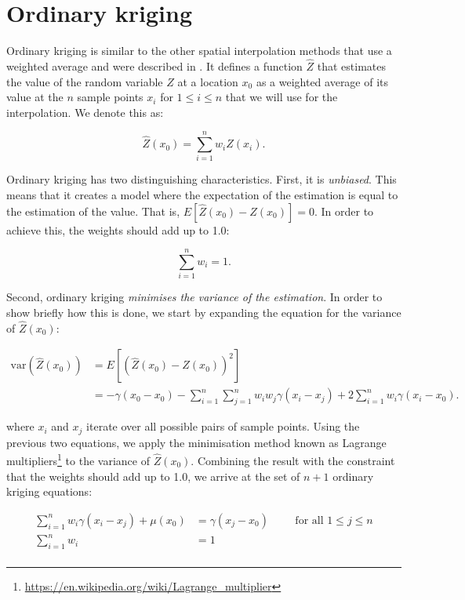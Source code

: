 \section{Ordinary kriging}

Ordinary kriging is similar to the other spatial interpolation methods that use a weighted average and were described in .
It defines a function \(\hat{Z}\) that estimates the value of the random variable \(Z\) at a location \(x_0\) as a weighted average of its value at the \(n\) sample points \(x_i\) for \(1 \leq i \leq n\) that we will use for the interpolation.
We denote this as:

\begin{equation}
\hat{Z}(x_0) = \sum_{i=1}^n w_i Z(x_i).
\end{equation}

Ordinary kriging has two distinguishing characteristics. First, it is \emph{unbiased}.
This means that it creates a model where the expectation of the estimation is equal to the estimation of the value.
That is, \(E\left[ \hat{Z}(x_0) - Z(x_0) \right] = 0\).
In order to achieve this, the weights should add up to 1.0:

\begin{equation}
\sum_{i=1}^n w_i = 1.
\end{equation}

Second, ordinary kriging \emph{minimises the variance of the estimation}. In order to show briefly how this is done, we start by expanding the equation for the variance of \(\hat{Z}\left(x_0\right)\):

\begin{align}
\mathrm{var}\left(\hat{Z}\left(x_0\right)\right) &= E\left[\left( \hat{Z}(x_0) - Z(x_0) \right)^2\right] \nonumber \\
&= -\gamma(x_0 - x_0) - \sum_{i=1}^n\sum_{j=1}^n w_i w_j \gamma(x_i-x_j) + 2 \sum_{i=1}^n w_i \gamma(x_i-x_0).
\end{align}

where \(x_i\) and \(x_j\) iterate over all possible pairs of sample points.
Using the previous two equations, we apply the minimisation method known as Lagrange multipliers\footnote{\url{https://en.wikipedia.org/wiki/Lagrange_multiplier}} to the variance of \(\hat{Z}\left(x_0\right)\).
Combining the result with the constraint that the weights should add up to 1.0, we arrive at the set of \(n+1\) ordinary kriging equations:

\begin{align}
\sum_{i=1}^n w_i \gamma(x_i-x_j) + \mu(x_0) &= \gamma(x_j-x_0) \hspace{1cm} \text{for all } 1 \leq j \leq n \\
\sum_{i=1}^n w_i &= 1 \\
\end{align}

